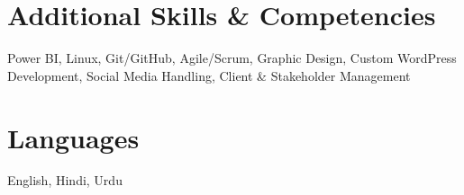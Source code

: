 \documentclass[10.5pt,a4paper]{article}
\begin{document}
\section*{Additional Skills \& Competencies}
Power BI, Linux, Git/GitHub, Agile/Scrum, Graphic Design, Custom WordPress Development, Social Media Handling, Client \& Stakeholder Management

\section*{Languages}
English, Hindi, Urdu
\end{document}
